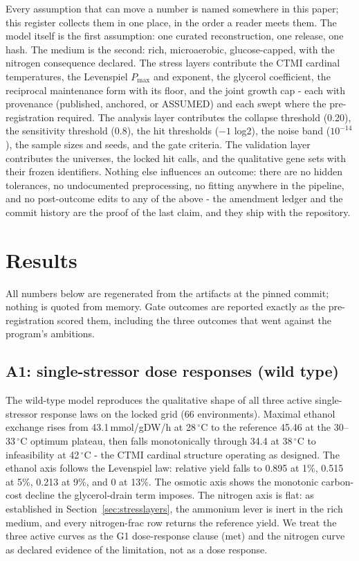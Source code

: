 \documentclass[12pt]{article}
\begin{document}
Every assumption that can move a number is named somewhere in this
paper; this register collects them in one place, in the order a
reader meets them. The model itself is the first assumption: one
curated reconstruction, one release, one hash. The medium is the
second: rich, microaerobic, glucose-capped, with the nitrogen
consequence declared. The stress layers contribute the CTMI cardinal
temperatures, the Levenspiel $P_{\max}$ and exponent, the glycerol
coefficient, the reciprocal maintenance form with its floor, and the
joint growth cap - each with provenance (published, anchored, or
ASSUMED) and each swept where the pre-registration required. The
analysis layer contributes the collapse threshold (0.20), the
sensitivity threshold (0.8), the hit thresholds ($-1$ log2), the
noise band ($10^{-14}$), the sample sizes and seeds, and the gate
criteria. The validation layer contributes the universes, the locked
hit calls, and the qualitative gene sets with their frozen
identifiers. Nothing else influences an outcome: there are no hidden
tolerances, no undocumented preprocessing, no fitting anywhere in
the pipeline, and no post-outcome edits to any of the above - the
amendment ledger and the commit history are the proof of the last
claim, and they ship with the repository.

\section{Results}
\label{sec:results}

All numbers below are regenerated from the artifacts at the pinned
commit; nothing is quoted from memory. Gate outcomes are reported
exactly as the pre-registration scored them, including the three
outcomes that went against the program's ambitions.

\subsection{A1: single-stressor dose responses (wild type)}

The wild-type model reproduces the qualitative shape of all three
active single-stressor response laws on the locked grid (66
environments). Maximal ethanol exchange rises from 43.1\,mmol/gDW/h at
28\,$^{\circ}$C to the reference 45.46 at the 30--33\,$^{\circ}$C
optimum plateau, then falls monotonically through 34.4 at
38\,$^{\circ}$C to infeasibility at 42\,$^{\circ}$C - the CTMI cardinal
structure operating as designed. The ethanol axis follows the
Levenspiel law: relative yield falls to 0.895 at 1\%, 0.515 at 5\%,
0.213 at 9\%, and 0 at 13\%. The osmotic axis shows the monotonic
carbon-cost decline the glycerol-drain term imposes. The nitrogen axis
is flat: as established in Section~\ref{sec:stresslayers}, the
ammonium lever is inert in the rich medium, and every nitrogen-frac
row returns the reference yield. We treat the three active curves as
the G1 dose-response clause (met) and the nitrogen curve as declared
evidence of the limitation, not as a dose response.
\end{document}
